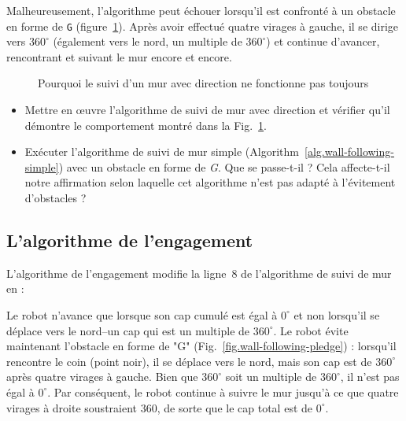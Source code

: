 Malheureusement, l'algorithme peut échouer lorsqu'il est confronté à un obstacle en forme de \texttt{G} (figure~\ref{fig.wall-direction-bug}). Après avoir effectué quatre virages à gauche, il se dirige vers $360^\circ$ (également vers le nord, un multiple de $360^\circ$) et continue d'avancer, rencontrant et suivant le mur encore et encore.

\begin{figure}
\begin{center}
\caption{Pourquoi le suivi d'un mur avec direction ne fonctionne pas toujours}\label{fig.wall-direction-bug}
\end{center}
\end{figure}

\begin{framed}
\begin{itemize}
\item Mettre en œuvre l'algorithme de suivi de mur avec direction et vérifier qu'il démontre le comportement montré dans la Fig.~\ref{fig.wall-direction-bug}.
\item Exécuter l'algorithme de suivi de mur simple (Algorithm~\ref{alg.wall-following-simple}) avec un obstacle en forme de \emph{G}. Que se passe-t-il ? Cela affecte-t-il notre affirmation selon laquelle cet algorithme n'est pas adapté à l'évitement d'obstacles ?
\end{itemize}
\end{framed}

\subsection{L'algorithme de l'engagement}

L'algorithme de l'engagement modifie la ligne~8 de l'algorithme de suivi de mur en :
\begin{quote}
\normalsize {}
\end{quote}
Le robot n'avance que lorsque son cap cumulé est égal à $0^\circ$ et non lorsqu'il se déplace vers le nord--un cap qui est un multiple de $360^\circ$. Le robot évite maintenant l'obstacle en forme de "G" (Fig.~\ref{fig.wall-following-pledge}) : lorsqu'il rencontre le coin (point noir), il se déplace vers le nord, mais son cap est de $360^\circ$ après quatre virages à gauche. Bien que $360^\circ$ soit un multiple de $360^\circ$, il n'est pas égal à $0^\circ$. Par conséquent, le robot continue à suivre le mur jusqu'à ce que quatre virages à droite soustraient $360$, de sorte que le cap total est de $0^\circ$.

